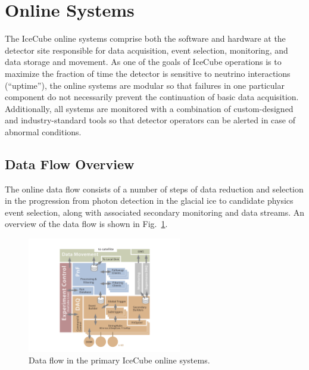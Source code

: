 
\section{\label{sect:online}Online Systems}

The IceCube online systems comprise both the software and hardware at the
detector site responsible for data acquisition, event selection,
monitoring, and data storage and movement.  As one of the goals of IceCube
operations is to maximize the fraction of time the detector is sensitive to
neutrino interactions (``uptime''), the online systems are modular so that
failures in one particular component do not necessarily prevent the
continuation of basic data acquisition. Additionally, all systems are
monitored with a combination of custom-designed and industry-standard tools
so that detector operators can be alerted in case of abnormal conditions.

\subsection{\label{sect:online:dataflow}Data Flow Overview}

The online data flow consists of a number of steps of data reduction and
selection in the progression from photon detection in the glacial ice to
candidate physics event selection, along with associated secondary
monitoring and data streams.  An overview of the data flow is shown in
Fig.~\ref{fig:online_dataflow}.

\begin{figure}[!ht]
 \centering
 \includegraphics[width=0.6\textwidth]{graphics/online/online_dataflow.pdf}
 \caption{Data flow in the primary IceCube online systems.}
 \label{fig:online_dataflow}
\end{figure}

